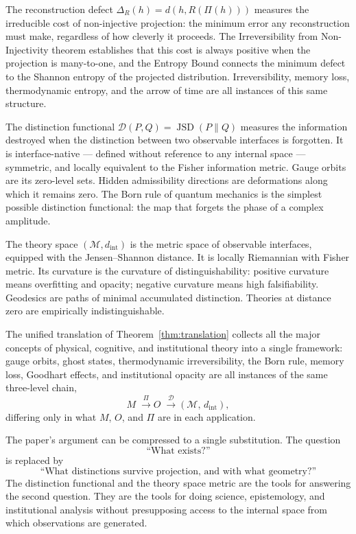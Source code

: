 \documentclass[12pt,a4paper]{article}
\theoremstyle{remark}
\theoremstyle{definition}
\begin{document}
The reconstruction defect $\Delta_R(h) = d(h, R(\Pi(h)))$ measures the
irreducible cost of non-injective projection: the minimum error any
reconstruction must make, regardless of how cleverly it proceeds. The
Irreversibility from Non-Injectivity theorem establishes that this cost
is always positive when the projection is many-to-one, and the Entropy
Bound connects the minimum defect to the Shannon entropy of the projected
distribution. Irreversibility, memory loss, thermodynamic entropy, and
the arrow of time are all instances of this same structure.

The distinction functional $\mathcal{D}(P,Q) = \operatorname{JSD}(P\|Q)$
measures the information destroyed when the distinction between two
observable interfaces is forgotten. It is interface-native --- defined
without reference to any internal space --- symmetric, and locally
equivalent to the Fisher information metric. Gauge orbits are its
zero-level sets. Hidden admissibility directions are deformations along
which it remains zero. The Born rule of quantum mechanics is the
simplest possible distinction functional: the map that forgets the phase
of a complex amplitude.

The theory space $(\mathcal{M}, d_{\mathrm{int}})$ is the metric space
of observable interfaces, equipped with the Jensen--Shannon distance.
It is locally Riemannian with Fisher metric. Its curvature is the
curvature of distinguishability: positive curvature means overfitting
and opacity; negative curvature means high falsifiability. Geodesics
are paths of minimal accumulated distinction. Theories at distance zero
are empirically indistinguishable.

The unified translation of Theorem~\ref{thm:translation} collects all
the major concepts of physical, cognitive, and institutional theory into
a single framework: gauge orbits, ghost states, thermodynamic
irreversibility, the Born rule, memory loss, Goodhart effects, and
institutional opacity are all instances of the same three-level chain,
\begin{equation*}
  M
  \;\xrightarrow{\;\Pi\;}
  O
  \;\xrightarrow{\;\mathcal{D}\;}
  (\mathcal{M},\, d_{\mathrm{int}}),
\end{equation*}
differing only in what $M$, $O$, and $\Pi$ are in each application.

The paper's argument can be compressed to a single substitution. The
question
\begin{equation*}
  \text{``What exists?''}
\end{equation*}
is replaced by
\begin{equation*}
  \text{``What distinctions survive projection, and with what geometry?''}
\end{equation*}
The distinction functional and the theory space metric are the tools for
answering the second question. They are the tools for doing science,
epistemology, and institutional analysis without presupposing access to
the internal space from which observations are generated.
\end{document}
